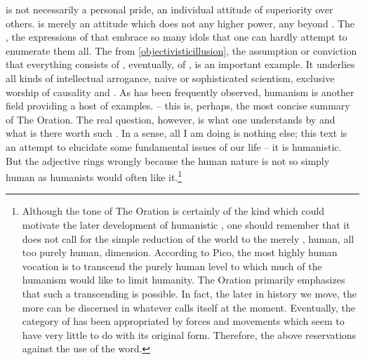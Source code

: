 \pa\label{adpride}  is not necessarily a personal pride, an
individual attitude of superiority over others.   is merely
an attitude which does not  any higher power, any
 beyond .  The , the
 expressions of that embrace so many idols that one
can hardly attempt to enumerate them all.  The  from \ref{objectivisticillusion}, the assumption or
conviction that everything consists of , eventually, of
, is an important example.  It underlies all kinds of
intellectual arrogance, naive or sophisticated scientism, exclusive
worship of causality and .  As has been frequently
observed, humanism is another field providing a host of examples. 
 -- this is, perhaps,
the most concise summary of The Oration.  The real question, however,
is what one understands by  and what is there worth such
.  In a sense, all I am doing is nothing else; this text
is an attempt to elucidate some fundamental issues of our life -- it
is humanistic.  But the adjective rings wrongly because the human
nature is not so simply human as humanists would often like
it.\footnote{Although the tone of The Oration is certainly of the kind
which could motivate the later development of humanistic ,
one should remember that it does not call for the simple reduction of
the world to the merely , human, all too purely human,
dimension.
According to Pico, the most highly human vocation is to transcend the
purely human level to which much of the humanism would like to limit
humanity.  The Oration primarily emphasizes that such a transcending is
possible.  In fact, the
later in history we move, the more  can be discerned in
whatever calls itself  at the moment.  Eventually, the
category of  has been appropriated by forces and
movements which seem to have very little to do with its original form. 
Therefore, the above reservations against the use of the word.}


